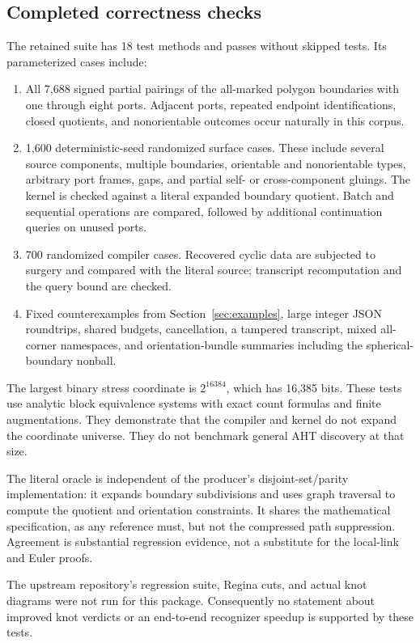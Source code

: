 \documentclass[11pt]{article}
\theoremstyle{definition}
\theoremstyle{remark}\newtheorem{remark}[theorem]{Remark}
\begin{document}
\subsection{Completed correctness checks}
The retained suite has 18 test methods and passes without skipped tests. Its parameterized cases include:
\begin{enumerate}
\item All 7,688 signed partial pairings of the all-marked polygon boundaries with one through eight ports. Adjacent ports, repeated endpoint identifications, closed quotients, and nonorientable outcomes occur naturally in this corpus.
\item 1,600 deterministic-seed randomized surface cases. These include several source components, multiple boundaries, orientable and nonorientable types, arbitrary port frames, gaps, and partial self- or cross-component gluings. The kernel is checked against a literal expanded boundary quotient. Batch and sequential operations are compared, followed by additional continuation queries on unused ports.
\item 700 randomized compiler cases. Recovered cyclic data are subjected to surgery and compared with the literal source; transcript recomputation and the query bound are checked.
\item Fixed counterexamples from Section~\ref{sec:examples}, large integer JSON roundtrips, shared budgets, cancellation, a tampered transcript, mixed all-corner namespaces, and orientation-bundle summaries including the spherical-boundary nonball.
\end{enumerate}

The largest binary stress coordinate is $2^{16384}$, which has 16,385 bits. These tests use analytic block equivalence systems with exact count formulas and finite augmentations. They demonstrate that the compiler and kernel do not expand the coordinate universe. They do not benchmark general AHT discovery at that size.

The literal oracle is independent of the producer's disjoint-set/parity implementation: it expands boundary subdivisions and uses graph traversal to compute the quotient and orientation constraints. It shares the mathematical specification, as any reference must, but not the compressed path suppression. Agreement is substantial regression evidence, not a substitute for the local-link and Euler proofs.

The upstream repository's regression suite, Regina cuts, and actual knot diagrams were not run for this package. Consequently no statement about improved knot verdicts or an end-to-end recognizer speedup is supported by these tests.
\end{document}
